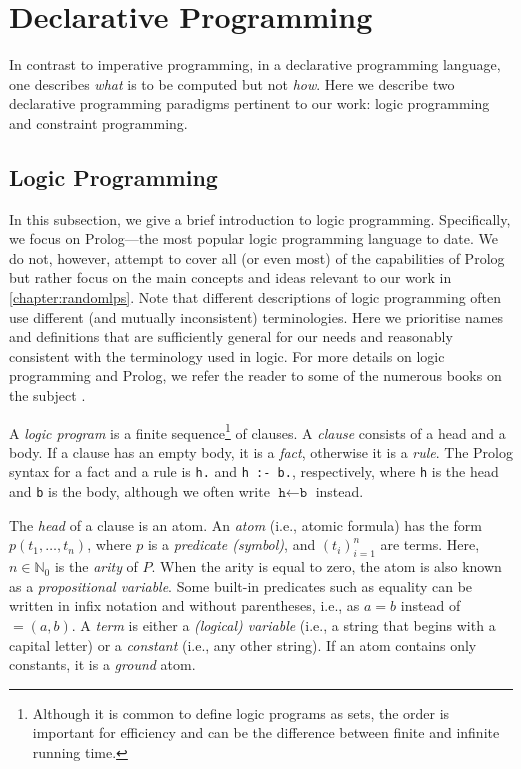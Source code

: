 \section{Declarative Programming}\label{sec:declarative}

In contrast to imperative programming, in a declarative programming language,
one describes \emph{what} is to be computed but not \emph{how}. Here we describe
two declarative programming paradigms pertinent to our work: logic programming
and constraint programming.

\subsection{Logic Programming}\label{sec:lp}

In this subsection, we give a brief introduction to logic programming.
Specifically, we focus on Prolog---the most popular logic programming language
to date. We do not, however, attempt to cover all (or even most) of the
capabilities of Prolog but rather focus on the main concepts and ideas relevant
to our work in \cref{chapter:randomlps}. Note that different descriptions of
logic programming often use different (and mutually inconsistent) terminologies.
Here we prioritise names and definitions that are sufficiently general for our
needs and reasonably consistent with the terminology used in logic. For more
details on logic programming and Prolog, we refer the reader to some of the
numerous books on the subject
\citep{DBLP:books/daglib/0041598,DBLP:books/daglib/0067951}.

A \emph{logic program} is a finite sequence\footnote{Although it is common to
  define logic programs as sets, the order is important for efficiency and can
  be the difference between finite and infinite running time.} of clauses. A
\emph{clause} consists of a head and a body. If a clause has an empty body, it
is a \emph{fact}, otherwise it is a \emph{rule}. The Prolog syntax for a fact
and a rule is \verb+h.+ and \verb+h :- b.+, respectively, where \texttt{h} is
the head and \texttt{b} is the body, although we often write
$\texttt{h} \gets \texttt{b}$ instead.

The \emph{head} of a clause is an atom. An \emph{atom} (i.e., atomic formula)
has the form $p(t_1, \dots, t_n)$, where $p$ is a \emph{predicate (symbol)}, and
${(t_i)}_{i=1}^n$ are terms. Here, $n \in \mathbb{N}_0$ is the \emph{arity} of
$P$. When the arity is equal to zero, the atom is also known as a
\emph{propositional variable}. Some built-in predicates such as equality can be
written in infix notation and without parentheses, i.e., as $a = b$ instead of
$=(a, b)$. A \emph{term} is either a \emph{(logical) variable} (i.e., a string
that begins with a capital letter) or a \emph{constant} (i.e., any other
string). If an atom contains only constants, it is a \emph{ground} atom.

